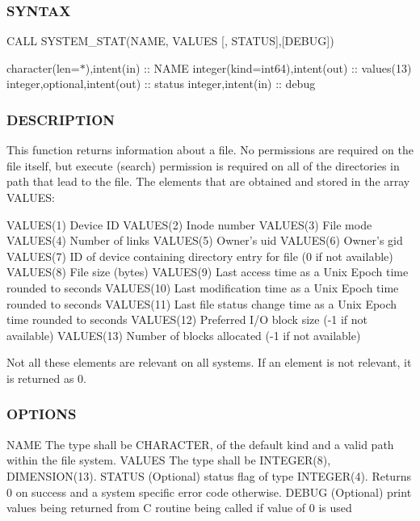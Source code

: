 \subsubsection*{S\+Y\+N\+T\+AX}

C\+A\+LL S\+Y\+S\+T\+E\+M\+\_\+\+S\+T\+A\+T(\+N\+A\+M\+E, V\+A\+L\+U\+E\+S \mbox{[}, S\+T\+A\+T\+U\+S\mbox{]},\mbox{[}\+D\+E\+B\+U\+G\mbox{]})

character(len=$\ast$),intent(in) \+:\+: N\+A\+ME integer(kind=int64),intent(out) \+:\+: values(13) integer,optional,intent(out) \+:\+: status integer,intent(in) \+:\+: debug

\subsubsection*{D\+E\+S\+C\+R\+I\+P\+T\+I\+ON}

\begin{DoxyVerb}This function returns information about a file. No permissions are
required on the file itself, but execute (search) permission is required
on all of the directories in path that lead to the file. The elements
that are obtained and stored in the array VALUES:

   VALUES(1) Device ID
   VALUES(2) Inode number
   VALUES(3) File mode
   VALUES(4) Number of links
   VALUES(5) Owner's uid
   VALUES(6) Owner's gid
   VALUES(7) ID of device containing directory entry for file (0 if not available)
   VALUES(8) File size (bytes)
   VALUES(9) Last access time as a Unix Epoch time rounded to seconds
   VALUES(10) Last modification time as a Unix Epoch time rounded to seconds
   VALUES(11) Last file status change time as a Unix Epoch time rounded to seconds
   VALUES(12) Preferred I/O block size (-1 if not available)
   VALUES(13) Number of blocks allocated (-1 if not available)

Not all these elements are relevant on all systems. If an element is
not relevant, it is returned as 0.
\end{DoxyVerb}


\subsubsection*{O\+P\+T\+I\+O\+NS}

\begin{DoxyVerb}NAME    The type shall be CHARACTER, of the default kind and a valid
        path within the file system.
VALUES  The type shall be INTEGER(8), DIMENSION(13).
STATUS  (Optional) status flag of type INTEGER(4). Returns 0 on success
        and a system specific error code otherwise.
DEBUG   (Optional) print values being returned from C routine being
        called if value of 0 is used
\end{DoxyVerb}


